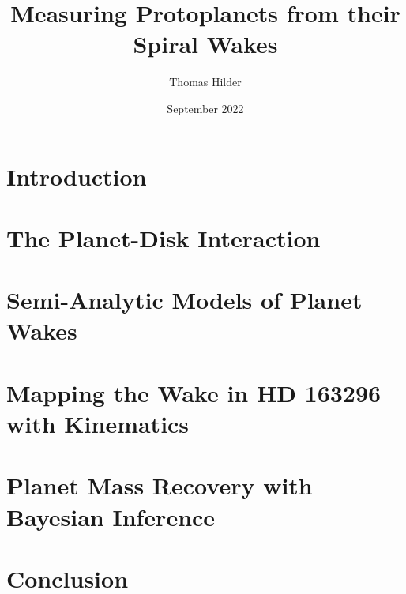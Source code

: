 \documentclass[11pt,a4paper,onecolumn]{report}
\title{Measuring Protoplanets from their Spiral Wakes}
\author{Thomas Hilder}
\date{September 2022}
\begin{document}
    
    

    

    

    

    \tableofcontents
    \clearpage


    \chapter{Introduction}
    

    \chapter{The Planet-Disk Interaction}
    

    \chapter{Semi-Analytic Models of Planet Wakes}
    

    \chapter{Mapping the Wake in HD 163296 with Kinematics}
    

    \chapter{Planet Mass Recovery with Bayesian Inference}
    

    \chapter{Conclusion}
    

    
    
\end{document}
